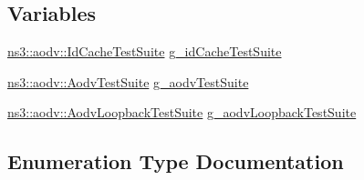 \subsection*{Variables}
\begin{DoxyCompactItemize}
\item 
\hyperlink{classns3_1_1aodv_1_1IdCacheTestSuite}{ns3\+::aodv\+::\+Id\+Cache\+Test\+Suite} \hyperlink{namespacens3_1_1aodv_aa474c1e6eccbc40ab8cb7b3eb4522b0c}{g\+\_\+id\+Cache\+Test\+Suite}
\item 
\hyperlink{classns3_1_1aodv_1_1AodvTestSuite}{ns3\+::aodv\+::\+Aodv\+Test\+Suite} \hyperlink{namespacens3_1_1aodv_a6bdcb01d640e6db83a090372c96ed015}{g\+\_\+aodv\+Test\+Suite}
\item 
\hyperlink{classns3_1_1aodv_1_1AodvLoopbackTestSuite}{ns3\+::aodv\+::\+Aodv\+Loopback\+Test\+Suite} \hyperlink{namespacens3_1_1aodv_a945eef28c158adb2600e316bef34575d}{g\+\_\+aodv\+Loopback\+Test\+Suite}
\end{DoxyCompactItemize}


\subsection{Enumeration Type Documentation}
